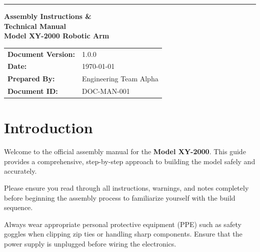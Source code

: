 \documentclass[11pt, a4paper]{article}
\begin{document}
\begin{titlepage}
    \centering
    \vspace*{2cm}
    
    {\color{gray}\rule{5cm}{5cm}} %
    
    \vspace{2.5cm}
    
    {\Huge \textbf{Assembly Instructions \& \vspace{0.3cm} \\ Technical Manual}}\\[1.5cm]
    
    {\huge \color{primary} \textbf{Model XY-2000 Robotic Arm}}\\[2cm] %
    
    \vfill
    
    \begin{tabular}{ll}
        \textbf{Document Version:} & 1.0.0 \\
        \textbf{Date:} & \today \\
        \textbf{Prepared By:} & Engineering Team Alpha \\
        \textbf{Document ID:} & DOC-MAN-001 \\
    \end{tabular}
    
    \vspace{2cm}
\end{titlepage}

\newpage

\tableofcontents
\newpage

\section{Introduction}
Welcome to the official assembly manual for the \textbf{Model XY-2000}. This guide provides a comprehensive, step-by-step approach to building the model safely and accurately. 

Please ensure you read through all instructions, warnings, and notes completely before beginning the assembly process to familiarize yourself with the build sequence.

\begin{warningbox}
Always wear appropriate personal protective equipment (PPE) such as safety goggles when clipping zip ties or handling sharp components. Ensure that the power supply is unplugged before wiring the electronics.
\end{warningbox}
\end{document}
